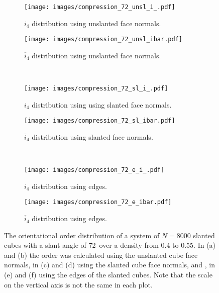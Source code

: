 \documentclass[thesis]{subfiles}
\begin{document}
\begin{figure}[H]
	\centering
	\begin{subfigure}{0.48\textwidth}
		\centering
		\texttt{[image: images/compression\_72\_unsl\_i\_.pdf]}
		\caption{$i_4$ distribution using unslanted face normals.}\label{fig:orient_comparison_unsl1}
	\end{subfigure}
	\begin{subfigure}{0.51\textwidth}
		\centering
		\texttt{[image: images/compression\_72\_unsl\_ibar.pdf]}
		\caption{$\overline i_4$ distribution using unslanted face normals.}\label{fig:orient_comparison_unsl2}
	\end{subfigure}\\\vspace{10pt}
	\begin{subfigure}{0.48\textwidth}
		\centering
		\texttt{[image: images/compression\_72\_sl\_i\_.pdf]}
		\caption{$i_4$ distribution using using slanted face normals.}\label{fig:orient_comparison_sl1}
	\end{subfigure}
	\begin{subfigure}{0.51\textwidth}
		\centering
		\texttt{[image: images/compression\_72\_sl\_ibar.pdf]}
		\caption{$\overline i_4$ distribution using slanted face normals.}\label{fig:orient_comparison_sl2}
	\end{subfigure}\\\vspace{10pt}
	\begin{subfigure}{0.48\textwidth}
		\centering
		\texttt{[image: images/compression\_72\_e\_i\_.pdf]}
		\caption{$i_4$ distribution using edges.}\label{fig:orient_comparison_e1}
	\end{subfigure}
	\begin{subfigure}{0.51\textwidth}
		\centering
		\texttt{[image: images/compression\_72\_e\_ibar.pdf]}
		\caption{$\overline i_4$ distribution using edges.}\label{fig:orient_comparison_e2}
	\end{subfigure}
	\caption{The orientational order distribution of a system of $N = 8000$ slanted cubes with a slant angle of 72\degr\ over a density from 0.4 to 0.55. In (a) and (b) the order was calculated using the unslanted cube face normals, in (c) and (d) using the slanted cube face normals, and , in (e) and (f) using the edges of the slanted cubes. Note that the scale on the vertical axis is not the same in each plot.}
	\label{fig:orient_comparison}
\end{figure}
\end{document}
